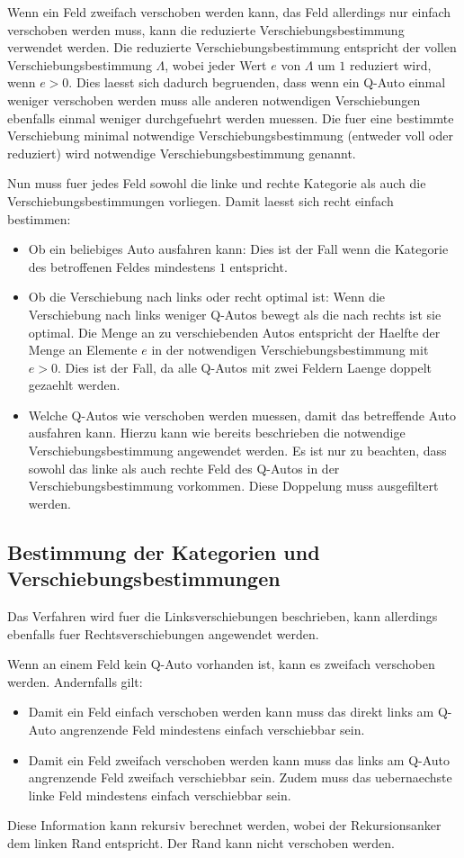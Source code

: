 \documentclass[a4paper,10pt,ngerman]{scrartcl}
\begin{document}
Wenn ein Feld zweifach verschoben werden kann, das Feld allerdings nur einfach verschoben werden muss, kann die reduzierte Verschiebungsbestimmung verwendet werden.
Die reduzierte Verschiebungsbestimmung entspricht der vollen Verschiebungsbestimmung $\Lambda$, wobei jeder Wert $e$ von $\Lambda$ um $1$ reduziert wird, wenn $e>0$.
Dies laesst sich dadurch begruenden, dass wenn ein Q-Auto einmal weniger verschoben werden muss alle anderen notwendigen Verschiebungen ebenfalls einmal weniger durchgefuehrt werden muessen.
Die fuer eine bestimmte Verschiebung minimal notwendige Verschiebungsbestimmung (entweder voll oder reduziert) wird notwendige Verschiebungsbestimmung genannt.

\medskip
Nun muss fuer jedes Feld sowohl die linke und rechte Kategorie als auch die Verschiebungsbestimmungen vorliegen.
Damit laesst sich recht einfach bestimmen:
\begin{itemize}
    \item Ob ein beliebiges Auto ausfahren kann:
          Dies ist der Fall wenn die Kategorie des betroffenen Feldes mindestens $1$ entspricht.
    \item Ob die Verschiebung nach links oder recht optimal ist:
          Wenn die Verschiebung nach links weniger Q-Autos bewegt als die nach rechts ist sie optimal.
          Die Menge an zu verschiebenden Autos entspricht der Haelfte der Menge an Elemente $e$ in der notwendigen Verschiebungsbestimmung mit $e>0$.
          Dies ist der Fall, da alle Q-Autos mit zwei Feldern Laenge doppelt gezaehlt werden.
    \item Welche Q-Autos wie verschoben werden muessen, damit das betreffende Auto ausfahren kann.
          Hierzu kann wie bereits beschrieben die notwendige Verschiebungsbestimmung angewendet werden.
          Es ist nur zu beachten, dass sowohl das linke als auch rechte Feld des Q-Autos in der Verschiebungsbestimmung vorkommen.
          Diese Doppelung muss ausgefiltert werden.
\end{itemize}

\subsection{Bestimmung der Kategorien und Verschiebungsbestimmungen}
Das Verfahren wird fuer die Linksverschiebungen beschrieben, kann allerdings ebenfalls fuer Rechtsverschiebungen angewendet werden.

Wenn an einem Feld kein Q-Auto vorhanden ist, kann es zweifach verschoben werden.
Andernfalls gilt:
\begin{itemize}
    \item Damit ein Feld einfach verschoben werden kann muss das direkt links am Q-Auto angrenzende Feld mindestens einfach verschiebbar sein.
    \item Damit ein Feld zweifach verschoben werden kann muss das links am Q-Auto angrenzende Feld zweifach verschiebbar sein.
          Zudem muss das uebernaechste linke Feld mindestens einfach verschiebbar sein.
\end{itemize}
Diese Information kann rekursiv berechnet werden, wobei der Rekursionsanker dem linken Rand entspricht.
Der Rand kann nicht verschoben werden.
\end{document}
